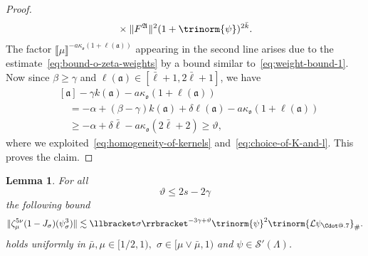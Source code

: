 \documentclass{article}
\makeatletter
\numberwithin{equation}{section}
\newcommand*\Cdot{{\mathpalette\Cdot@{.7}}}
\newcommand*\Cdot@[2]{\mathbin{\vcenter{\hbox{\scalebox{#2}{\hspace{0.1mm}$\m@th#1\bullet$\hspace{0.1mm}}}}}}
\theoremstyle{plain}
\newtheorem{lemma}[theorem]{Lemma}
\theoremstyle{definition}
\makeatother
\begin{document}
\begin{proof}
\begin{align*}
 &\quad \times
    \| F^{\mathfrak{A}} \|^2
    (1 + \trinorm{ \psi })^{2 \bar{k}} .
  \end{align*}
  The factor $\llbracket \mu \rrbracket^{- a
  \kappa_{\mathfrak{o}} (1 + \ell (\mathfrak{a}))}$ appearing in the second
  line arises due to the estimate~\eqref{eq:bound-o-zeta-weights} by a bound
  similar to~\eqref{eq:weight-bound-1}. Now since $\beta \geqslant \gamma$
  and $\ell (\mathfrak{a}) \in [\bar{\ell}+1, 2 \bar{\ell}+1]$, we have
  \begin{align*}
    &[\mathfrak{a}] - \gamma k (\mathfrak{a})
    - a \kappa_{\mathfrak{o}} (1 + \ell(\mathfrak{a}))\\
    &\quad = - \alpha + (\beta - \gamma) k(\mathfrak{a})
    + \delta \ell(\mathfrak{a})
    - a \kappa_{\mathfrak{o}} (1 + \ell(\mathfrak{a}))\\
    &\quad \geqslant - \alpha + \delta \bar{\ell}
    - a \kappa_{\mathfrak{o}} (2 \bar{\ell} + 2) \geqslant \vartheta,
  \end{align*}
  where we exploited~\eqref{eq:homogeneity-of-kernels}
  and~\eqref{eq:choice-of-K-and-l}. This proves the claim.
\end{proof}

\begin{lemma}
  \label{lem:difference-bound}For all
  \begin{equation}
    \vartheta \leqslant 2 s - 2 \gamma \label{eq:one-J-bound}
  \end{equation}
  the following bound
  \[ \| \zeta_{\mu}^{5 \nu}  (1 - J_{\sigma}) (\psi_{\sigma}^3) \| \lesssim
     \llbracket \sigma \rrbracket^{- 3 \gamma + \vartheta}  \trinorm{ \psi
     }^2  \trinorm{ \mathcal{L} \psi_{\Cdot} }_{\#} .
  \]
  holds uniformly in $\bar{\mu}, \mu \in [1 / 2, 1),$ $\sigma \in [\mu \vee
  \bar{\mu}, 1) $ and $\psi \in \mathcal{S}' (\Lambda)$.
\end{lemma}
\end{document}
